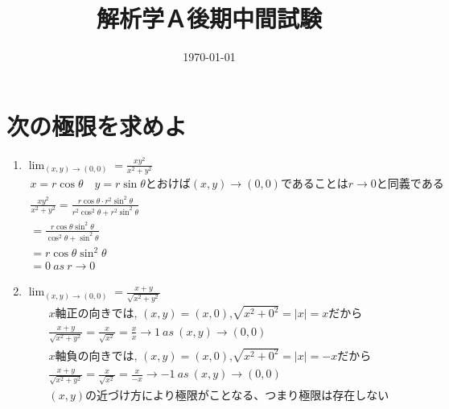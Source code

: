 \documentclass[a4paper,10pt]{jarticle}
\title{解析学Ａ後期中間試験}
\date{\today}
\begin{document}
\setlength{\parindent}{0pt}
\setlength{\columnseprule}{0.4pt}

\renewcommand{\thesection}{\fbox{\arabic{section}}}
\renewcommand{\labelenumi}{(\theenumi)}

\maketitle

\section{次の極限を求めよ}
\begin{enumerate}
\item $\displaystyle \lim_{(x,y) \to (0,0)} = \frac{xy^2}{x^2+y^2}$\begin{gather*}
	x = r \cos\theta \quad y = r \sin\theta \text{とおけば} (x,y) \to (0,0) \text{であることは} r \to 0 \text{と同義である}\\
	\frac{xy^2}{x^2+y^2} = \frac{r\cos\theta \cdot r^2\sin^2\theta}{r^2 \cos^2\theta + r^2\sin^2\theta} \\
	=\frac{r\cos\theta\sin^2\theta}{\cos^2\theta+\sin^2\theta} \\
	=r\cos\theta\sin^2\theta\\
	=0 \  as \ r \to 0
\end{gather*}
\item $\displaystyle \lim_{(x,y) \to (0,0)} = \frac{x+y}{\sqrt{x^2+y^2}}$\begin{gather*}
	x\text{軸正の向きでは, }(x, y) = (x, 0) \text{,} \sqrt{x^2 + 0^2} = |x| = x \text{だから} \\
	\frac{x+y}{\sqrt{x^2+y^2}} = \frac{x}{\sqrt{x^2}} = \frac{x}{x} \to 1 \ as \ (x,y) \to (0,0) \\
	x\text{軸負の向きでは, }(x, y) = (x, 0) \text{,} \sqrt{x^2 + 0^2} = |x| = -x \text{だから} \\
	\frac{x+y}{\sqrt{x^2+y^2}} = \frac{x}{\sqrt{x^2}} = \frac{x}{-x} \to -1 \ as \ (x,y) \to (0,0) \\
	(x,y)\text{の近づけ方により極限がことなる、つまり極限は存在しない}
\end{gather*}
\end{enumerate}

\end{document}
